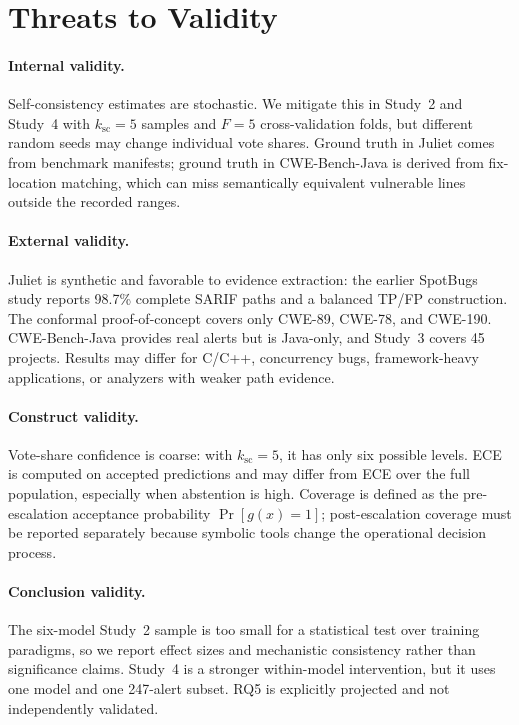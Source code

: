 \section{Threats to Validity}
\label{sec:threats}

\paragraph{Internal validity.}
Self-consistency estimates are stochastic. We mitigate this in Study~2 and Study~4 with $k_{\mathrm{sc}}=5$ samples and $F=5$ cross-validation folds, but different random seeds may change individual vote shares. Ground truth in Juliet comes from benchmark manifests; ground truth in CWE-Bench-Java is derived from fix-location matching, which can miss semantically equivalent vulnerable lines outside the recorded ranges.

\paragraph{External validity.}
Juliet is synthetic and favorable to evidence extraction: the earlier SpotBugs study reports 98.7\% complete SARIF paths and a balanced TP/FP construction. The conformal proof-of-concept covers only CWE-89, CWE-78, and CWE-190. CWE-Bench-Java provides real alerts but is Java-only, and Study~3 covers 45 projects. Results may differ for C/C++, concurrency bugs, framework-heavy applications, or analyzers with weaker path evidence.

\paragraph{Construct validity.}
Vote-share confidence is coarse: with $k_{\mathrm{sc}}=5$, it has only six possible levels. ECE is computed on accepted predictions and may differ from ECE over the full population, especially when abstention is high. Coverage is defined as the pre-escalation acceptance probability $\Pr[g(x)=1]$; post-escalation coverage must be reported separately because symbolic tools change the operational decision process.

\paragraph{Conclusion validity.}
The six-model Study~2 sample is too small for a statistical test over training paradigms, so we report effect sizes and mechanistic consistency rather than significance claims. Study~4 is a stronger within-model intervention, but it uses one model and one 247-alert subset. RQ5 is explicitly projected and not independently validated.

